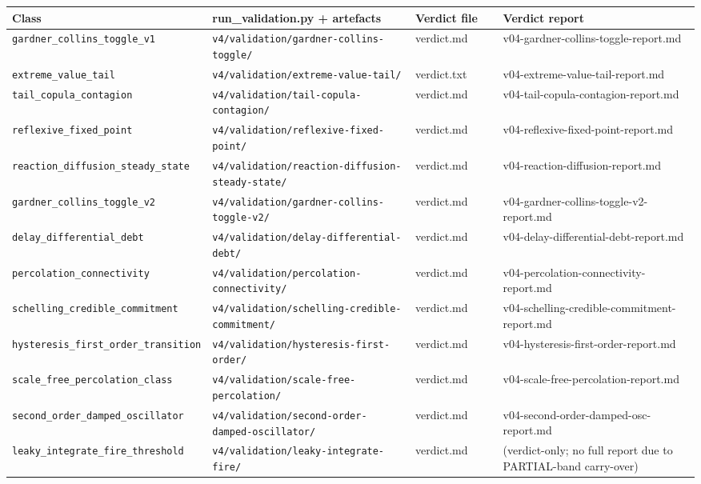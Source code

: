 \documentclass[
  11pt]{article}
\newcounter{none} %
\begin{document}
{\def\LTcaptype{none} %
\begin{longtable}[]{@{}p{0.27\linewidth}p{0.30\linewidth}p{0.13\linewidth}p{0.30\linewidth}@{}}
\toprule\noalign{}
Class & run\_validation.py + artefacts & Verdict file & Verdict report \\
\midrule\noalign{}
\endhead
\bottomrule\noalign{}
\endlastfoot
\texttt{gardner\_collins\_toggle\_v1} & \texttt{v4/validation/gardner-collins-toggle/} & verdict.md & v04-gardner-collins-toggle-report.md \\
\texttt{extreme\_value\_tail} & \texttt{v4/validation/extreme-value-tail/} & verdict.txt & v04-extreme-value-tail-report.md \\
\texttt{tail\_copula\_contagion} & \texttt{v4/validation/tail-copula-contagion/} & verdict.md & v04-tail-copula-contagion-report.md \\
\texttt{reflexive\_fixed\_point} & \texttt{v4/validation/reflexive-fixed-point/} & verdict.md & v04-reflexive-fixed-point-report.md \\
\texttt{reaction\_diffusion\_steady\_state} & \texttt{v4/validation/reaction-diffusion-steady-state/} & verdict.md & v04-reaction-diffusion-report.md \\
\texttt{gardner\_collins\_toggle\_v2} & \texttt{v4/validation/gardner-collins-toggle-v2/} & verdict.md & v04-gardner-collins-toggle-v2-report.md \\
\texttt{delay\_differential\_debt} & \texttt{v4/validation/delay-differential-debt/} & verdict.md & v04-delay-differential-debt-report.md \\
\texttt{percolation\_connectivity} & \texttt{v4/validation/percolation-connectivity/} & verdict.md & v04-percolation-connectivity-report.md \\
\texttt{schelling\_credible\_commitment} & \texttt{v4/validation/schelling-credible-commitment/} & verdict.md & v04-schelling-credible-commitment-report.md \\
\texttt{hysteresis\_first\_order\_transition} & \texttt{v4/validation/hysteresis-first-order/} & verdict.md & v04-hysteresis-first-order-report.md \\
\texttt{scale\_free\_percolation\_class} & \texttt{v4/validation/scale-free-percolation/} & verdict.md & v04-scale-free-percolation-report.md \\
\texttt{second\_order\_damped\_oscillator} & \texttt{v4/validation/second-order-damped-oscillator/} & verdict.md & v04-second-order-damped-osc-report.md \\
\texttt{leaky\_integrate\_fire\_threshold} & \texttt{v4/validation/leaky-integrate-fire/} & verdict.md & (verdict-only; no full report due to PARTIAL-band carry-over) \\

\end{longtable}}
\end{document}
